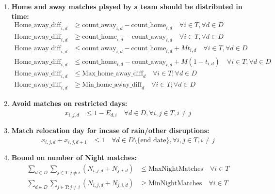 \documentclass[a4paper, 12pt]{article}
\begin{document}
\begin{enumerate}
    \item \textbf{Home and away matches played by a team should be distributed in time:}
    \begin{align*}
        \text{Home\_away\_diff}_{i,d} &\geq \text{count\_away}_{i,d} - \text{count\_home}_{i,d} \quad \forall i \in T, \forall d \in D\\
        \text{Home\_away\_diff}_{i,d} &\geq \text{count\_home}_{i,d} - \text{count\_away}_{i,d} \quad \forall i \in T, \forall d \in D \\
        \text{Home\_away\_diff}_{i,d} &\leq \text{count\_away}_{i,d} - \text{count\_home}_{i,d} + M t_{i,d} \quad \forall i \in T, \forall d \in D\\
        \text{Home\_away\_diff}_{i,d} &\leq \text{count\_home}_{i,d} - \text{count\_away}_{i,d} + M (1 - t_{i,d}) \quad \forall i \in T, \forall d \in D\\
        \text{Home\_away\_diff}_{i,d} &\leq \text{Max\_home\_away\_diff}_{d} \quad \forall i \in T; \forall d \in D\\
        \text{Home\_away\_diff}_{i,d} &\geq \text{Min\_home\_away\_diff}_{d} \quad \forall i \in T; \forall d \in D
    \end{align*}
    \item \textbf{Avoid matches on restricted days:}
    \begin{align*}
        x_{i,j,d} &\leq 1 - E_{d,i} \quad \forall d \in D, \forall i,j \in T, i \neq j
    \end{align*}

    \item \textbf{Match relocation day for incase of rain/other disruptions:}
    \begin{align*}
        x_{i,j,d} + x_{i,j,d+1} &\leq 1 \quad \forall d \in D \setminus \{ \text{end\_date} \}, \forall i,j \in T, i \neq j
    \end{align*}

    \item \textbf{Bound on number of Night matches:}
    \begin{align*}
        \sum_{d \in D} \sum_{j \in T : j \neq i} (N_{i,j,d} + N_{j,i,d}) &\leq \text{MaxNightMatches} \quad \forall i \in T\\
        \sum_{d \in D} \sum_{j \in T : j \neq i} (N_{i,j,d} + N_{j,i,d}) &\geq \text{MinNightMatches} \quad \forall i \in T
    \end{align*}


\end{enumerate}
\end{document}
